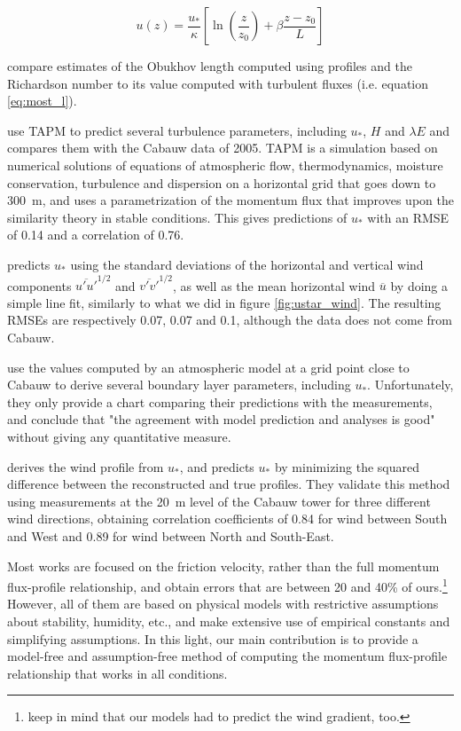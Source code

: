 \documentclass[a4paper,11pt]{kth-mag}
\begin{document}
\begin{equation}
\label{eq:profile_method}
u(z)=\frac{u_*}{\kappa}\left[\ln\left(\frac{z}{z_0}\right)+\beta\frac{z-z_0}{L}\right]
\end{equation}

\cite{Irwin1981} compare estimates of the Obukhov length computed using profiles and the Richardson number to its value computed with turbulent fluxes (i.e. equation \ref{eq:most_l}).

\cite{cabauw_preds} use TAPM to predict several turbulence parameters, including $u_*$, $H$ and $\lambda E$ and compares them with the Cabauw data of 2005. TAPM is a simulation based on numerical solutions of equations of atmospheric flow, thermodynamics, moisture conservation, turbulence and dispersion on a horizontal grid that goes down to \SI{300}{\meter}, and uses a parametrization of the momentum flux that improves upon the similarity theory in stable conditions. This gives predictions of $u_*$ with an RMSE of 0.14 and a correlation of 0.76.

\cite{weber1999} predicts $u_*$ using the standard deviations of the  horizontal and vertical wind components $\overline{u'u'}^{1/2}$ and $\overline{v'v'}^{1/2}$, as well as the mean horizontal wind $\overline{u}$ by doing a simple line fit, similarly to what we did in figure \ref{fig:ustar_wind}. The resulting RMSEs are respectively 0.07, 0.07 and 0.1, although the data does not come from Cabauw.

\cite{predict_micro_from_macro_sim} use the values computed by an atmospheric model at a grid point close to Cabauw to derive several boundary layer parameters, including $u_*$. Unfortunately, they only provide a chart comparing their predictions with the measurements, and conclude that "the agreement with model prediction and analyses is good" without giving any quantitative measure.

\cite{ustar_from_profile} derives the wind profile from $u_*$, and predicts $u_*$ by minimizing the squared difference between the reconstructed and true profiles. They validate this method using measurements at the \SI{20}{\meter} level of the Cabauw tower for three different wind directions, obtaining correlation coefficients of 0.84 for wind between South and West and 0.89 for wind between North and South-East.

Most works are focused on the friction velocity, rather than the full momentum flux-profile relationship, and obtain errors that are between 20 and 40\% of ours.\footnote{keep in mind that our models had to predict the wind gradient, too.} However, all of them are based on physical models with restrictive assumptions about stability, humidity, etc., and make extensive use of empirical constants and simplifying assumptions. In this light, our main contribution is to provide a model-free and assumption-free method of computing the momentum flux-profile relationship that works in all conditions.
\end{document}
